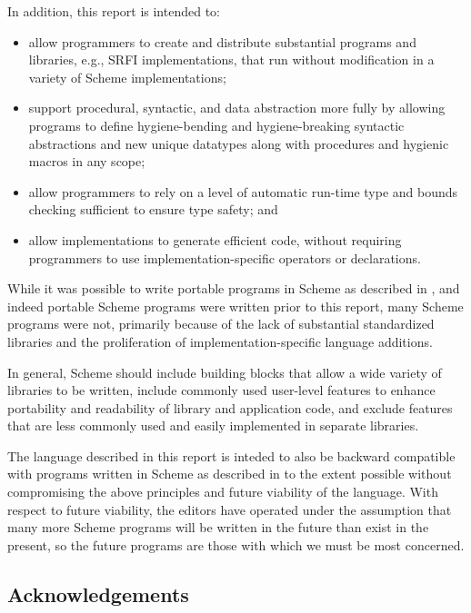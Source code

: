 In addition, this report is intended to:

\begin{itemize}
\item allow programmers to create and distribute substantial programs
  and libraries, e.g., SRFI implementations, that run without
  modification in a variety of Scheme implementations;
  
\item support procedural, syntactic, and data abstraction more fully
  by allowing programs to define hygiene-bending and hygiene-breaking
  syntactic abstractions and new unique datatypes along with
  procedures and hygienic macros in any scope;
  
\item allow programmers to rely on a level of automatic run-time type
  and bounds checking sufficient to ensure type safety; and

\item allow implementations to generate efficient code, without
  requiring programmers to use implementation-specific operators or
  declarations.
\end{itemize}

While it was possible to write portable programs in Scheme as
described in , and indeed portable Scheme programs were written
prior to this report, many Scheme programs were not, primarily because
of the lack of substantial standardized libraries and the
proliferation of implementation-specific language additions.

In general, Scheme should include building blocks that allow a wide
variety of libraries to be written, include commonly used user-level
features to enhance portability and readability of library and
application code, and exclude features that are less commonly used and
easily implemented in separate libraries.

The language described in this report is inteded to also be backward
compatible with programs written in Scheme as described in  to
the extent possible without compromising the above principles and
future viability of the language.  With respect to future viability,
the editors have operated under the assumption that many more Scheme
programs will be written in the future than exist in the present, so
the future programs are those with which we must be most concerned.

\subsection*{Acknowledgements}

